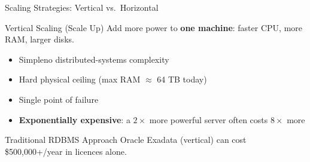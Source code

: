 \documentclass[aspectratio=169,10pt]{beamer}
\begin{document}
\begin{frame}{Scaling Strategies: Vertical vs.\ Horizontal}
      \begin{block}{Vertical Scaling (Scale Up)}
        Add more power to \textbf{one machine}: faster CPU, more RAM, larger disks.
        \vspace{4pt}
        \begin{itemize}
          \item Simple\textemdash no distributed-systems complexity
          \item Hard physical ceiling (max RAM $\approx$ 64 TB today)
          \item Single point of failure
          \item \textbf{Exponentially expensive}: a $2\times$ more powerful server often costs $8\times$ more
        \end{itemize}
      \end{block}
      \begin{alertblock}{Traditional RDBMS Approach}
        Oracle Exadata (vertical) can cost \$500{,}000+/year in licences alone.
      \end{alertblock}

\end{frame}
\end{document}

